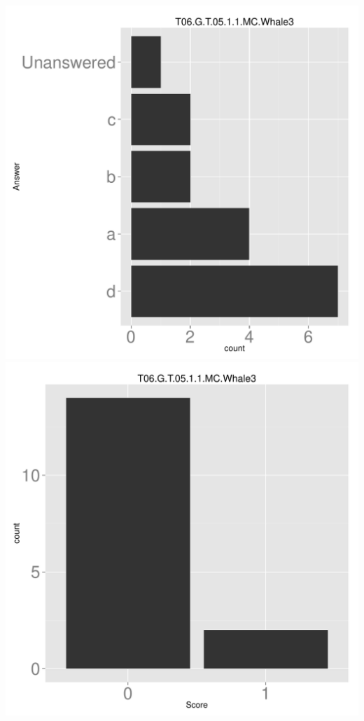 \documentclass[12pt,nohyper]{tufte-handout}\usepackage[]{graphicx}\usepackage[]{color}
\begin{document}
\begin{center} \includegraphics[width=.45\linewidth]{Topic06_83_answer} \includegraphics[width=.45\linewidth]{Topic06_83_score} \end{center} 
\end{document}
